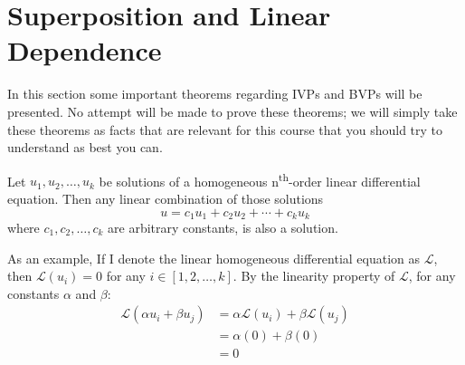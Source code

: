 \section{Superposition and Linear Dependence}
In this section some important theorems regarding IVPs and BVPs will be presented.  No attempt will be made to prove these theorems; we will simply take these theorems as facts that are relevant for this course that you should try to understand as best you can.

\begin{theorem}
Let $u_1,u_2,\dots,u_k$ be solutions of a homogeneous n\textsuperscript{th}-order linear differential equation.  Then any linear combination of those solutions 
$$u = c_1u_1+c_2u_2+\cdots+c_ku_k$$where $c_1,c_2,\dots,c_k$ are arbitrary constants, is also a solution.
\end{theorem}
As an example, If I denote the linear homogeneous differential equation as $\mathcal{L}$, then $\mathcal{L}(u_i) = 0$ for any $i \in [1,2,\dots,k]$.  By the linearity property of $\mathcal{L}$, for any constants $\alpha$ and $\beta$:
\begin{align*}
\mathcal{L}(\alpha u_i + \beta u_j) &=  \alpha \mathcal{L}(u_i) + \beta \mathcal{L}(u_j)\\
&= \alpha(0) + \beta(0) \\
&= 0
\end{align*}

